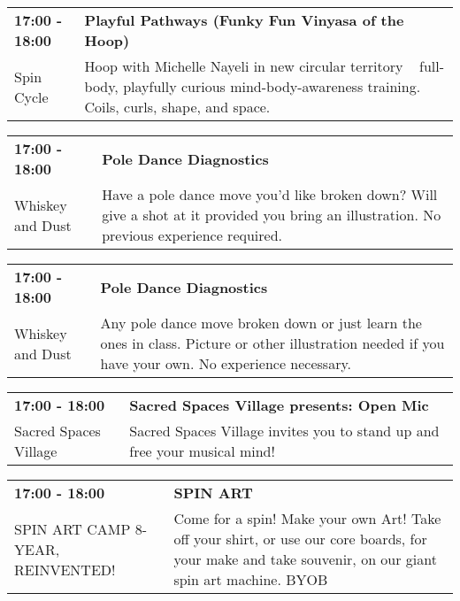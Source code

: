 \begin{tabular}{ p{1in} p{2.2in} }
    \textbf{17:00 - 18:00} & \textbf{Playful Pathways (Funky Fun Vinyasa of the Hoop)} \\
    Spin Cycle \newline  & Hoop with Michelle Nayeli in new circular territory ~ full-body, playfully curious mind-body-awareness training. Coils, curls, shape, and space. \\
    \hline 
\end{tabular}
    
\begin{tabular}{ p{1in} p{2.2in} }
    \textbf{17:00 - 18:00} & \textbf{Pole Dance Diagnostics} \\
    Whiskey and Dust \newline  & Have a pole dance move you'd like broken down? Will give a shot at it provided you bring an illustration. No previous experience required. \\
    \hline 
\end{tabular}
    
\begin{tabular}{ p{1in} p{2.2in} }
    \textbf{17:00 - 18:00} & \textbf{Pole Dance Diagnostics} \\
    Whiskey and Dust \newline  & Any pole dance move broken down or just learn the ones in class. Picture or other illustration needed if you have your own. No experience necessary. \\
    \hline 
\end{tabular}
    
\begin{tabular}{ p{1in} p{2.2in} }
    \textbf{17:00 - 18:00} & \textbf{Sacred Spaces Village presents: Open Mic} \\
    Sacred Spaces Village \newline  & Sacred Spaces Village invites you to stand up and free your musical mind! \\
    \hline 
\end{tabular}
    
\begin{tabular}{ p{1in} p{2.2in} }
    \textbf{17:00 - 18:00} & \textbf{SPIN ART} \\
    SPIN ART CAMP 8-YEAR, REINVENTED! \newline  & Come for a spin! Make your own Art! Take off your shirt, or use our core boards, for your make and take souvenir, on our giant spin art machine. BYOB \\
    \hline 
\end{tabular}
    
